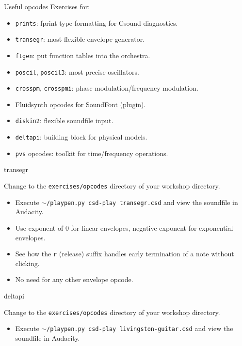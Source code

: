 \documentclass{beamer}
\begin{document}
\begin{frame}{Useful opcodes}
Exercises for:
\begin{itemize}
\item \texttt{prints}: fprint-type formatting for Csound diagnostics.
\item \texttt{transegr}: most flexible envelope generator.
\item \texttt{ftgen}: put function tables into the orchestra.
\item \texttt{poscil}, \texttt{poscil3}: most precise oscillators.
\item \texttt{crosspm}, \texttt{crosspmi}: phase modulation/frequency modulation.
\item Fluidsynth opcodes for SoundFont (plugin).
\item \texttt{diskin2}: flexible soundfile input.
\item \texttt{deltapi}: building block for physical models.
\item \texttt{pvs} opcodes: toolkit for time/frequency operations.
\end{itemize}
\end{frame}

\begin{frame}{transegr}
\begin{example}
Change to the \texttt{exercises/opcodes} directory of your workshop directory.
\begin{itemize}
\item Execute \texttt{$\sim$/playpen.py csd-play transegr.csd} and view the soundfile in Audacity.
\end{itemize}
\end{example}
\begin{itemize}
\item Use exponent of 0 for linear envelopes, negative exponent for exponential envelopes.
\item See how the \texttt{r} (release) suffix handles early termination of a note without clicking.
\item No need for any other envelope opcode.
\end{itemize}
\end{frame}

\begin{frame}{deltapi}
\begin{example}
Change to the \texttt{exercises/opcodes} directory of your workshop directory.
\begin{itemize}
\item Execute \texttt{$\sim$/playpen.py csd-play livingston-guitar.csd} and view the soundfile in Audacity.
\end{itemize}
\end{example}
\end{frame}
\end{document}
